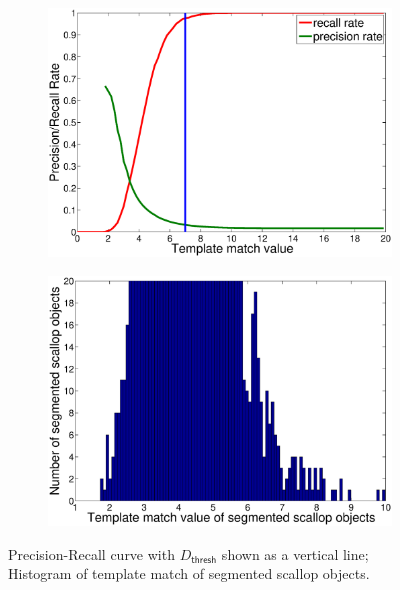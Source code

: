 \documentclass {udthesis}
\begin{document}
%
\begin{figure}
  \centering
  \begin{subfigure}{0.47\textwidth}
      \includegraphics[width=\textwidth]{precision_recall}
      \caption{}
      \label{subfig:precision_recall}
  \end{subfigure}
  \begin{subfigure}{0.47\textwidth}
      \includegraphics[width=\textwidth]{template_thresh_hist}         
      \caption{}
      \label{subfig:template_hist}
  \end{subfigure}
  \caption[Precision-Recall curves for Classification Layer]{ Precision-Recall curve with $D_\mathsf{thresh}$ shown as
  a vertical line;  
  Histogram of template match of segmented scallop objects.}
  \label{detection-curves}
\end{figure}
\end{document}
